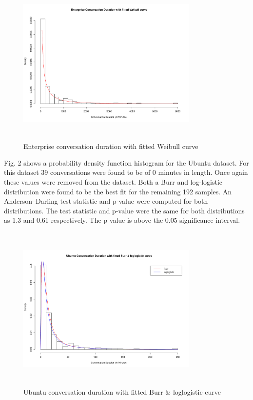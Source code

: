 \documentclass[conference]{IEEEtran}
\begin{document}
\begin{figure}
\begin{center}
\includegraphics[height=8.3cm, width=9cm]{01_duration_enterprise.pdf} 
\caption{Enterprise conversation duration with fitted Weibull curve}
\end{center}
\label{fig:duration_ent}
\end{figure}


Fig. 2 shows a probability density function histogram for the Ubuntu dataset. For this dataset 39 conversations were found to be of 0 minutes in length. Once again these values were removed from the dataset. Both a Burr and log-logistic distribution were found to be the best fit for the remaining 192 samples. An Anderson--Darling test statistic and p-value were computed for both distributions. The test statistic and p-value were the same for both distributions as 1.3 and 0.61 respectively. The p-value is above the 0.05 significance interval.

\begin{figure}
\begin{center}
\includegraphics[height=8.3cm, width=9cm]{02_duration_ubuntu.pdf} 
\caption{Ubuntu conversation duration with fitted Burr & loglogistic curve}
\end{center}
\label{fig:duration_ubun}
\end{figure}
\end{document}
